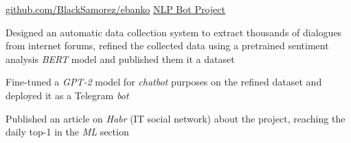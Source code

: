 \begin{cventries}
  \cventry
    {\href{https://github.com/BlackSamorez/ebanko}{\url{github.com/BlackSamorez/ebanko}}} %
    {\faGithub\acvHeaderIconSep\href{https://github.com/BlackSamorez/ebanko}{NLP Bot Project}} %
    {} %
    {} %
    {
      \begin{cvitems} %
        \item {Designed an automatic data collection system to extract thousands of dialogues from internet forums, refined the collected data using a pretrained sentiment analysis \textit{BERT} model and published them it a dataset}
        \item {Fine-tuned a \textit{GPT-2} model for \textit{chatbot} purposes on the refined dataset and deployed it as a Telegram \textit{bot}}
        \item {Published an article on \textit{Habr} (IT social network) about the project, reaching the daily top-1 in the \textit{ML} section}
      \end{cvitems}
    }
    

\end{cventries}